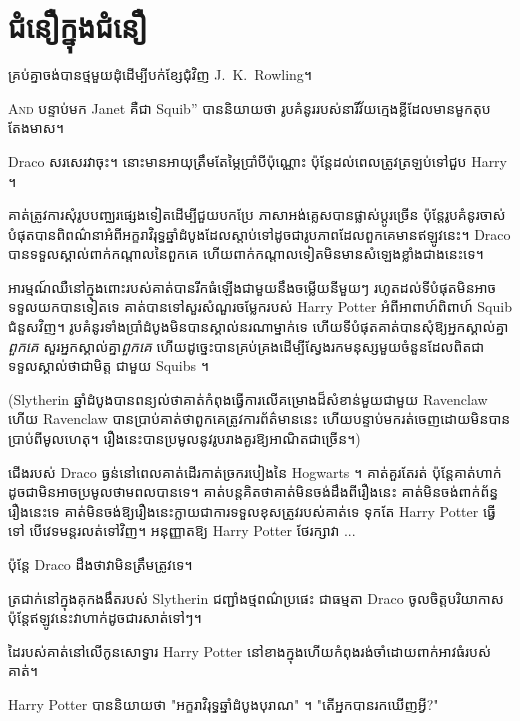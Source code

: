 \chapter{ជំនឿក្នុងជំនឿ}

\begin{chapterOpeningAuthorNote}
គ្រប់​គ្នា​ចង់​បាន​ថ្ម​មួយ​ដុំ​ដើម្បី​បក់​ខ្សែ​ជុំវិញ J.~K.~Rowling។
\end{chapterOpeningAuthorNote}

\lettrine[ante=“]{A}{nd} បន្ទាប់មក Janet គឺជា Squib” បាននិយាយថា រូបគំនូររបស់នារីវ័យក្មេងខ្លីដែលមានមួកតុបតែងមាស។

Draco សរសេរវាចុះ។ នោះ​មាន​អាយុ​ត្រឹមតែ​ម្ភៃ​ប្រាំបី​ប៉ុណ្ណោះ ប៉ុន្តែ​ដល់​ពេល​ត្រូវ​ត្រឡប់​ទៅ​ជួប Harry ។

គាត់ត្រូវការសុំរូបបញ្ឈរផ្សេងទៀតដើម្បីជួយបកប្រែ ភាសាអង់គ្លេសបានផ្លាស់ប្តូរច្រើន ប៉ុន្តែរូបគំនូរចាស់បំផុតបានពិពណ៌នាអំពីអក្ខរាវិរុទ្ធឆ្នាំដំបូងដែលស្តាប់ទៅដូចជារូបភាពដែលពួកគេមានឥឡូវនេះ។ Draco បានទទួលស្គាល់ពាក់កណ្តាលនៃពួកគេ ហើយពាក់កណ្តាលទៀតមិនមានសំឡេងខ្លាំងជាងនេះទេ។

អារម្មណ៍ឈឺនៅក្នុងពោះរបស់គាត់បានរីកធំឡើងជាមួយនឹងចម្លើយនីមួយៗ រហូតដល់ទីបំផុតមិនអាចទទួលយកបានទៀតទេ គាត់បានទៅសួរសំណួរចម្លែករបស់ Harry Potter អំពីអាពាហ៍ពិពាហ៍ Squib ជំនួសវិញ។ រូបគំនូរទាំងប្រាំដំបូងមិនបានស្គាល់នរណាម្នាក់ទេ ហើយទីបំផុតគាត់បានសុំឱ្យអ្នកស្គាល់គ្នា\emph{ពួកគេ} សួរអ្នកស្គាល់គ្នា\emph{ពួកគេ} ហើយដូច្នេះបានគ្រប់គ្រងដើម្បីស្វែងរកមនុស្សមួយចំនួនដែលពិតជាទទួលស្គាល់ថាជាមិត្ត ជាមួយ Squibs ។

(Slytherin ឆ្នាំដំបូងបានពន្យល់ថាគាត់កំពុងធ្វើការលើគម្រោងដ៏សំខាន់មួយជាមួយ Ravenclaw ហើយ Ravenclaw បានប្រាប់គាត់ថាពួកគេត្រូវការព័ត៌មាននេះ ហើយបន្ទាប់មករត់ចេញដោយមិនបានប្រាប់ពីមូលហេតុ។ រឿងនេះបានប្រមូលនូវរូបរាងគួរឱ្យអាណិតជាច្រើន។)

ជើងរបស់ Draco ធ្ងន់នៅពេលគាត់ដើរកាត់ច្រករបៀងនៃ Hogwarts ។ គាត់គួរតែរត់ ប៉ុន្តែគាត់ហាក់ដូចជាមិនអាចប្រមូលថាមពលបានទេ។ គាត់បន្តគិតថាគាត់មិនចង់ដឹងពីរឿងនេះ គាត់មិនចង់ពាក់ព័ន្ធរឿងនេះទេ គាត់មិនចង់ឱ្យរឿងនេះក្លាយជាការទទួលខុសត្រូវរបស់គាត់ទេ ទុកតែ Harry Potter ធ្វើទៅ បើវេទមន្តរលត់ទៅវិញ។ អនុញ្ញាតឱ្យ Harry Potter ថែរក្សាវា ...

ប៉ុន្តែ Draco ដឹងថាវាមិនត្រឹមត្រូវទេ។

ត្រជាក់នៅក្នុងគុកងងឹតរបស់ Slytherin ជញ្ជាំងថ្មពណ៌ប្រផេះ ជាធម្មតា Draco ចូលចិត្តបរិយាកាស ប៉ុន្តែឥឡូវនេះវាហាក់ដូចជារសាត់ទៅៗ។

ដៃរបស់គាត់នៅលើកូនសោទ្វារ Harry Potter នៅខាងក្នុងហើយកំពុងរង់ចាំដោយពាក់អាវធំរបស់គាត់។

Harry Potter បាននិយាយថា "អក្ខរាវិរុទ្ធឆ្នាំដំបូងបុរាណ" ។ "តើអ្នកបានរកឃើញអ្វី?"

